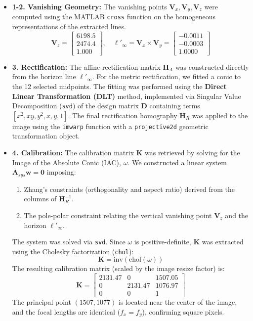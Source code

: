 \documentclass[a4paper,11pt]{article}
\newcommand{\matr}[1]{\bm{#1}}     %
\newcommand{\vect}[1]{\mathbf{#1}}  %
\begin{document}
\begin{itemize}
    \item \textbf{1-2. Vanishing Geometry:}
    The vanishing points $\vect{V}_x, \vect{V}_y, \vect{V}_z$ were computed using the MATLAB \texttt{cross} function on the homogeneous representations of the extracted lines.
    \begin{equation}
        \vect{V}_z = \begin{bmatrix} 6198.5 \\ 2474.4 \\ 1.000 \end{bmatrix}, \quad
        \ell'_\infty = \vect{V}_x \times \vect{V}_y = \begin{bmatrix} -0.0011 \\ -0.0003 \\ 1.0000 \end{bmatrix}
    \end{equation}

    \item \textbf{3. Rectification:}
    The affine rectification matrix $\matr{H}_A$ was constructed directly from the horizon line $\ell'_\infty$.
    For the metric rectification, we fitted a conic to the 12 selected midpoints. The fitting was performed using the \textbf{Direct Linear Transformation (DLT)} method, implemented via Singular Value Decomposition (\texttt{svd}) of the design matrix $\matr{D}$ containing terms $[x^2, xy, y^2, x, y, 1]$.
    The final rectification homography $\matr{H}_R$ was applied to the image using the \texttt{imwarp} function with a \texttt{projective2d} geometric transformation object.

    \item \textbf{4. Calibration:}
    The calibration matrix $\matr{K}$ was retrieved by solving for the Image of the Absolute Conic (IAC), $\omega$. We constructed a linear system $\matr{A}_{sys}\vect{w} = \mathbf{0}$ imposing:
    \begin{enumerate}
        \item Zhang's constraints (orthogonality and aspect ratio) derived from the columns of $\matr{H}_R^{-1}$.
        \item The pole-polar constraint relating the vertical vanishing point $\vect{V}_z$ and the horizon $\ell'_\infty$.
    \end{enumerate}
    The system was solved via \texttt{svd}. Since $\omega$ is positive-definite, $\matr{K}$ was extracted using the Cholesky factorization (\texttt{chol}):
    \[
    \matr{K} = \text{inv}(\text{chol}(\omega))
    \]
    The resulting calibration matrix (scaled by the image resize factor) is:
    \[
    \matr{K} =
    \begin{bmatrix}
    2131.47 & 0 & 1507.05 \\
    0 & 2131.47 & 1076.97 \\
    0 & 0 & 1
    \end{bmatrix}
    \]
    The principal point $(1507, 1077)$ is located near the center of the image, and the focal lengths are identical ($f_x = f_y$), confirming square pixels.


\end{itemize}
\end{document}
